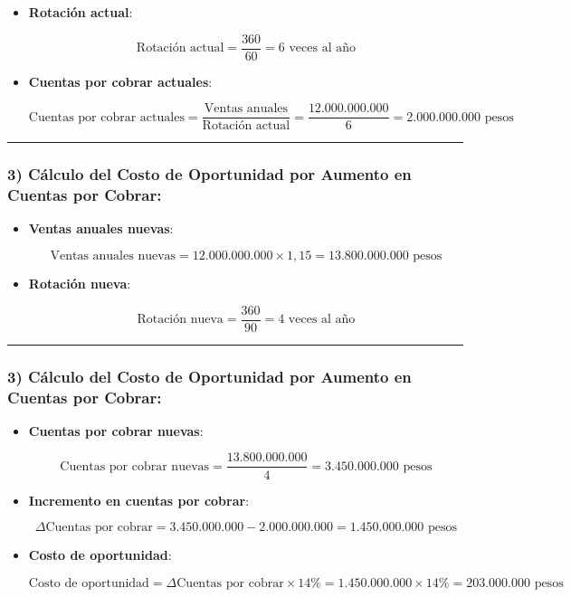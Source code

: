 \documentclass[
  letterpaper,
  DIV=11,
  numbers=noendperiod]{scrartcl}
\begin{document}
\begin{itemize}
\item
  \textbf{Rotación actual}:

  \[
  \text{Rotación actual} = \frac{360}{60} = 6 \text{ veces al año}
  \]
\item
  \textbf{Cuentas por cobrar actuales}:

  \[
  \text{Cuentas por cobrar actuales} = \frac{\text{Ventas anuales}}{\text{Rotación actual}} = \frac{12.000.000.000}{6} = 2.000.000.000 \text{ pesos}
  \]
\end{itemize}

\begin{center}\rule{0.5\linewidth}{0.5pt}\end{center}

\subsubsection{3) Cálculo del Costo de Oportunidad por Aumento en
Cuentas por
Cobrar:}\label{cuxe1lculo-del-costo-de-oportunidad-por-aumento-en-cuentas-por-cobrar-1}

\begin{itemize}
\item
  \textbf{Ventas anuales nuevas}:

  \[
  \text{Ventas anuales nuevas} = 12.000.000.000 \times 1,15 = 13.800.000.000 \text{ pesos}
  \]
\item
  \textbf{Rotación nueva}:

  \[
  \text{Rotación nueva} = \frac{360}{90} = 4 \text{ veces al año}
  \]
\end{itemize}

\begin{center}\rule{0.5\linewidth}{0.5pt}\end{center}

\subsubsection{3) Cálculo del Costo de Oportunidad por Aumento en
Cuentas por
Cobrar:}\label{cuxe1lculo-del-costo-de-oportunidad-por-aumento-en-cuentas-por-cobrar-2}

\begin{itemize}
\item
  \textbf{Cuentas por cobrar nuevas}:

  \[
  \text{Cuentas por cobrar nuevas} = \frac{13.800.000.000}{4} = 3.450.000.000 \text{ pesos}
  \]
\item
  \textbf{Incremento en cuentas por cobrar}:

  \[
  \Delta \text{Cuentas por cobrar} = 3.450.000.000 - 2.000.000.000 = 1.450.000.000 \text{ pesos}
  \]
\item
  \textbf{Costo de oportunidad}:

  \[
  \text{Costo de oportunidad} = \Delta \text{Cuentas por cobrar} \times 14\% = 1.450.000.000 \times 14\% = 203.000.000 \text{ pesos}
  \]
\end{itemize}
\end{document}
